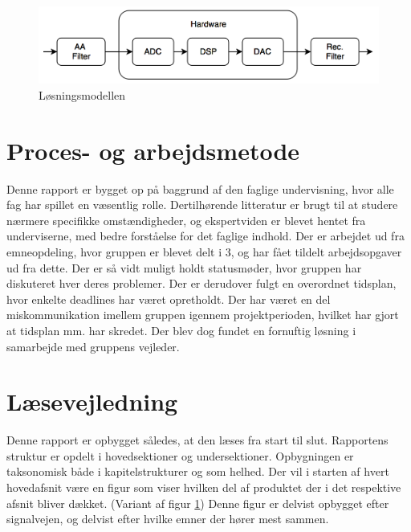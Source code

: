\begin{figure}[h]
	\centering
	\includegraphics[width=15cm]{billeder/flow_losn}
	\caption{Løsningsmodellen}
	\label{fig:losningsmodel}
\end{figure}
\section{Proces- og arbejdsmetode}
Denne rapport er bygget op på baggrund af den faglige undervisning, hvor alle fag har spillet en væsentlig rolle. Dertilhørende litteratur er brugt til at studere nærmere specifikke omstændigheder, og ekspertviden er blevet hentet fra underviserne, med bedre forståelse for det faglige indhold. Der er arbejdet ud fra emneopdeling, hvor gruppen er blevet delt i 3, og har fået tildelt arbejdsopgaver ud fra dette. Der er så vidt muligt holdt statusmøder, hvor gruppen har diskuteret hver deres problemer. Der er derudover fulgt en overordnet tidsplan, hvor enkelte deadlines har været opretholdt. Der har været en del miskommunikation imellem gruppen igennem projektperioden, hvilket har gjort at tidsplan mm. har skredet. Der blev dog fundet en fornuftig løsning i samarbejde med gruppens vejleder.


\section{Læsevejledning}
Denne rapport er opbygget således, at den læses fra start til slut. Rapportens struktur er opdelt i hovedsektioner og undersektioner. Opbygningen er taksonomisk både i kapitelstrukturer og som helhed. Der vil i starten af hvert hovedafsnit være en figur som viser hvilken del af produktet der i det respektive afsnit bliver dækket. (Variant af figur \ref{fig:losningsmodel}) Denne figur er delvist opbygget efter signalvejen, og delvist efter hvilke emner der hører mest sammen.

